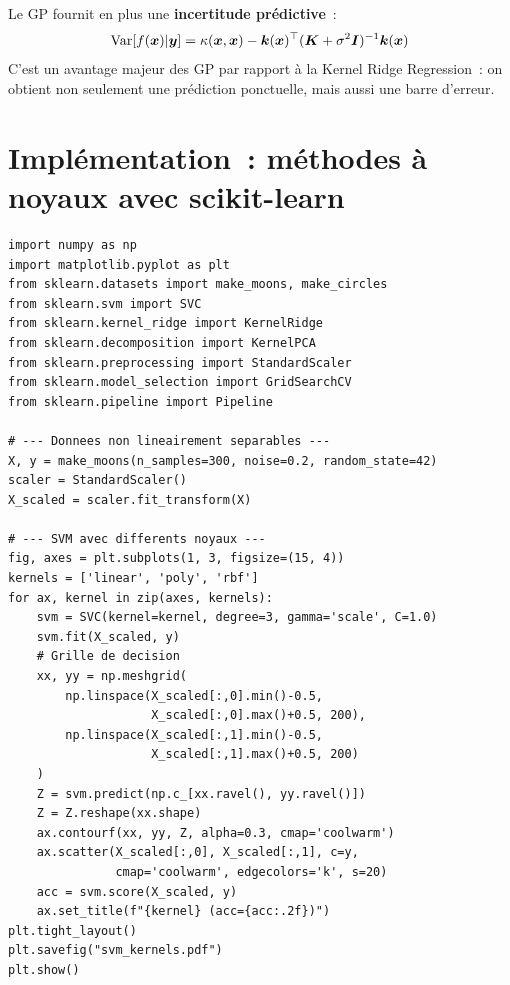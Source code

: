 \begin{remarque}
Le GP fournit en plus une \textbf{incertitude pr\'edictive}~:
\begin{equation}
  \mathrm{Var}[f(\bm{x}) | \bm{y}] = \kappa(\bm{x}, \bm{x}) -
  \bm{k}(\bm{x})^\top (\bm{K} + \sigma^2 \bm{I})^{-1} \bm{k}(\bm{x})
\end{equation}
C'est un avantage majeur des GP par rapport \`a la Kernel Ridge
Regression~: on obtient non seulement une pr\'ediction ponctuelle,
mais aussi une barre d'erreur.
\end{remarque}

\section{Impl\'ementation~: m\'ethodes \`a noyaux avec scikit-learn}
\label{sec:implementation-kernels}

\begin{codeblock}[title=\textbf{SVM \`a noyau, Kernel Ridge et Kernel PCA}]
\begin{verbatim}
import numpy as np
import matplotlib.pyplot as plt
from sklearn.datasets import make_moons, make_circles
from sklearn.svm import SVC
from sklearn.kernel_ridge import KernelRidge
from sklearn.decomposition import KernelPCA
from sklearn.preprocessing import StandardScaler
from sklearn.model_selection import GridSearchCV
from sklearn.pipeline import Pipeline

# --- Donnees non lineairement separables ---
X, y = make_moons(n_samples=300, noise=0.2, random_state=42)
scaler = StandardScaler()
X_scaled = scaler.fit_transform(X)

# --- SVM avec differents noyaux ---
fig, axes = plt.subplots(1, 3, figsize=(15, 4))
kernels = ['linear', 'poly', 'rbf']
for ax, kernel in zip(axes, kernels):
    svm = SVC(kernel=kernel, degree=3, gamma='scale', C=1.0)
    svm.fit(X_scaled, y)
    # Grille de decision
    xx, yy = np.meshgrid(
        np.linspace(X_scaled[:,0].min()-0.5,
                    X_scaled[:,0].max()+0.5, 200),
        np.linspace(X_scaled[:,1].min()-0.5,
                    X_scaled[:,1].max()+0.5, 200)
    )
    Z = svm.predict(np.c_[xx.ravel(), yy.ravel()])
    Z = Z.reshape(xx.shape)
    ax.contourf(xx, yy, Z, alpha=0.3, cmap='coolwarm')
    ax.scatter(X_scaled[:,0], X_scaled[:,1], c=y,
               cmap='coolwarm', edgecolors='k', s=20)
    acc = svm.score(X_scaled, y)
    ax.set_title(f"{kernel} (acc={acc:.2f})")
plt.tight_layout()
plt.savefig("svm_kernels.pdf")
plt.show()
\end{verbatim}
\end{codeblock}

